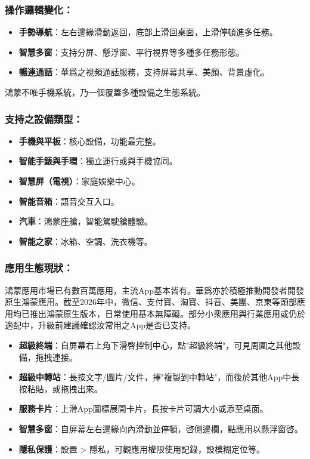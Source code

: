 \subsubsection*{操作邏輯變化：}

\begin{itemize}
  \item \textbf{手勢導航}：左右邊緣滑動返回，底部上滑回桌面，上滑停頓進多任務。
  \item \textbf{智慧多窗}：支持分屏、懸浮窗、平行視界等多種多任務形態。
  \item \textbf{暢連通話}：華爲之視頻通話服務，支持屏幕共享、美顏、背景虛化。
\end{itemize}


鴻蒙不唯手機系統，乃一個覆蓋多種設備之生態系統。

\subsubsection*{支持之設備類型：}

\begin{itemize}
  \item \textbf{手機與平板}：核心設備，功能最完整。
  \item \textbf{智能手錶與手環}：獨立運行或與手機協同。
  \item \textbf{智慧屏（電視）}：家庭娛樂中心。
  \item \textbf{智能音箱}：語音交互入口。
  \item \textbf{汽車}：鴻蒙座艙，智能駕駛艙體驗。
  \item \textbf{智能之家}：冰箱、空調、洗衣機等。
\end{itemize}

\subsubsection*{應用生態現狀：}

鴻蒙應用市場已有數百萬應用，主流App基本皆有。華爲亦於積極推動開發者開發原生鴻蒙應用。截至2026年中，微信、支付寶、淘寶、抖音、美團、京東等頭部應用均已推出鴻蒙原生版本，日常使用基本無障礙。部分小衆應用與行業應用或仍於適配中，升級前建議確認汝常用之App是否已支持。


\begin{itemize}
  \item \textbf{超級終端}：自屏幕右上角下滑啓控制中心，點"超級終端"，可見周圍之其他設備，拖拽連接。
  \item \textbf{超級中轉站}：長按文字/圖片/文件，擇"複製到中轉站"，而後於其他App中長按粘貼，或拖拽出來。
  \item \textbf{服務卡片}：上滑App圖標展開卡片，長按卡片可調大小或添至桌面。
  \item \textbf{智慧多窗}：自屏幕左右邊緣向內滑動並停頓，啓側邊欄，點應用以懸浮窗啓。
  \item \textbf{隱私保護}：設置 > 隱私，可觀應用權限使用記錄，設模糊定位等。
\end{itemize}

